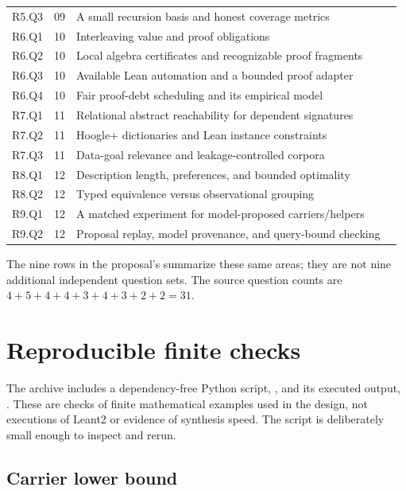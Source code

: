 \begin{longtable}{@{}L{17mm}L{14mm}L{105mm}r@{}}
R5.Q3 & 09 & A small recursion basis and honest coverage metrics & \pageref{q:R5.Q3}\\
R6.Q1 & 10 & Interleaving value and proof obligations & \pageref{q:R6.Q1}\\
R6.Q2 & 10 & Local algebra certificates and recognizable proof fragments & \pageref{q:R6.Q2}\\
R6.Q3 & 10 & Available Lean automation and a bounded proof adapter & \pageref{q:R6.Q3}\\
R6.Q4 & 10 & Fair proof-debt scheduling and its empirical model & \pageref{q:R6.Q4}\\
R7.Q1 & 11 & Relational abstract reachability for dependent signatures & \pageref{q:R7.Q1}\\
R7.Q2 & 11 & Hoogle+ dictionaries and Lean instance constraints & \pageref{q:R7.Q2}\\
R7.Q3 & 11 & Data-goal relevance and leakage-controlled corpora & \pageref{q:R7.Q3}\\
R8.Q1 & 12 & Description length, preferences, and bounded optimality & \pageref{q:R8.Q1}\\
R8.Q2 & 12 & Typed equivalence versus observational grouping & \pageref{q:R8.Q2}\\
R9.Q1 & 12 & A matched experiment for model-proposed carriers/helpers & \pageref{q:R9.Q1}\\
R9.Q2 & 12 & Proposal replay, model provenance, and query-bound checking & \pageref{q:R9.Q2}\\
\bottomrule
\end{longtable}

The nine rows in the proposal's  summarize these same areas; they are not nine additional independent question sets. The source question counts are $4+5+4+4+3+4+3+2+2=31$.

\section{Reproducible finite checks}\label{app:checks}

The archive includes a dependency-free Python script, , and its executed output, . These are checks of finite mathematical examples used in the design, not executions of Leant2 or evidence of synthesis speed. The script is deliberately small enough to inspect and rerun.

\subsection{Carrier lower bound}

